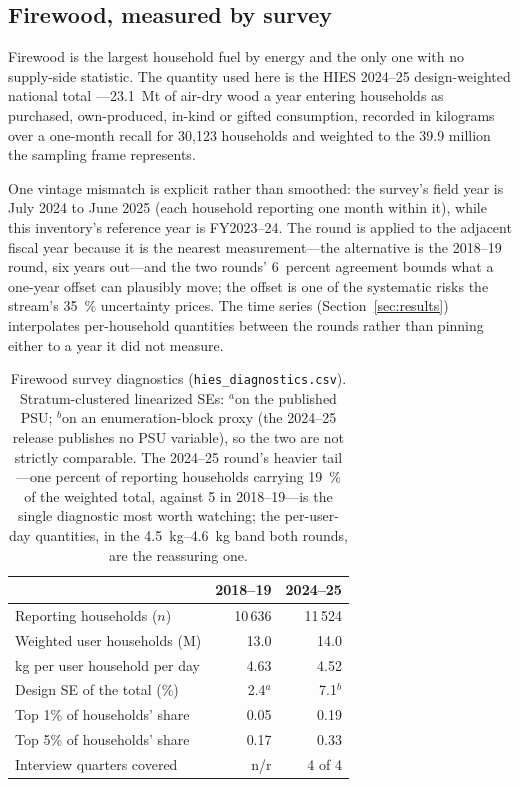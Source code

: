 \subsection{Firewood, measured by survey}

Firewood is the largest household fuel by energy and the only one with no
supply-side statistic. The quantity used here is the HIES 2024--25 design-weighted
national total \citep{hies2025}---\SI{23.1}{\mega\tonne} of air-dry wood a year entering
households as purchased, own-produced, in-kind or gifted consumption, recorded in kilograms
over a one-month recall for 30,123 households and weighted to the 39.9 million the sampling
frame represents.

One vintage mismatch is explicit rather than smoothed: the survey's field year is July 2024
to June 2025 (each household reporting one month within it), while this inventory's
reference year is FY2023--24. The round is applied to the adjacent fiscal year because it
is the nearest measurement---the alternative is the 2018--19 round, six years out---and
the two rounds' 6~percent agreement bounds what a one-year offset can plausibly move; the
offset is one of the systematic risks the stream's \SI{35}{\percent} uncertainty prices.
The time series (Section~\ref{sec:results}) interpolates per-household quantities between
the rounds rather than pinning either to a year it did not measure.

\begin{table}[htbp]
\centering
\footnotesize
\begin{tabular}{@{}lrr@{}}
\toprule
 & \textbf{2018--19} & \textbf{2024--25} \\
\midrule
Reporting households ($n$)          & 10\,636 & 11\,524 \\
Weighted user households (M)        & 13.0 & 14.0 \\
kg per user household per day       & 4.63 & 4.52 \\
Design SE of the total (\%)         & 2.4$^a$ & 7.1$^b$ \\
Top 1\% of households' share        & 0.05 & 0.19 \\
Top 5\% of households' share        & 0.17 & 0.33 \\
Interview quarters covered          & n/r & 4 of 4 \\
\bottomrule
\end{tabular}
\caption{Firewood survey diagnostics
(\texttt{hies\_diagnostics.csv}). Stratum-clustered linearized SEs: $^a$on the
published PSU; $^b$on an enumeration-block proxy (the 2024--25 release publishes no
PSU variable), so the two are not strictly comparable. The 2024--25 round's heavier
tail---one percent of reporting households carrying \SI{19}{\percent} of the weighted
total, against \SI{5}{} in 2018--19---is the single diagnostic most worth watching;
the per-user-day quantities, in the \SIrange{4.5}{4.6}{\kilo\gram} band both rounds,
are the reassuring one.}
\label{tab:hiesdiag}
\end{table}

